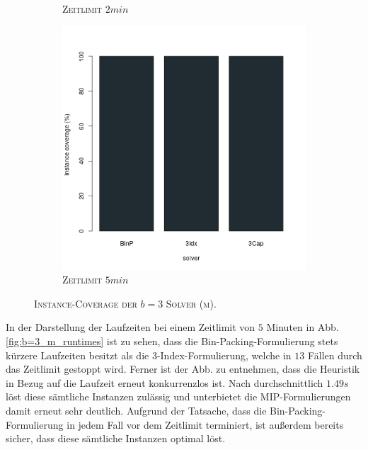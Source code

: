 \begin{figure}[H]
\begin{subfigure}[b]{0.3\textwidth}
\caption{\textsc{Zeitlimit} $2min$}
\label{fig:instance_coverage_b=3_m_b}
\end{subfigure}
\hfill
\begin{subfigure}[b]{0.3\textwidth}
\centering
\includegraphics[width=1.1\textwidth]{img/solver_instance_coverage_b=3_m_300s.png}
\caption{\textsc{Zeitlimit} $5min$}
\label{fig:instance_coverage_b=3_m_c}
\end{subfigure}
\caption{\textsc{Instance-Coverage der $b = 3$ Solver (m)}.}
\label{fig:instance_coverage_b=3_m}
\end{figure}

In der Darstellung der Laufzeiten bei einem Zeitlimit von $5$ Minuten in Abb. \ref{fig:b=3_m_runtimes} ist zu sehen, dass die Bin-Packing-Formulierung stets kürzere Laufzeiten besitzt als die 3-Index-Formulierung, welche in $13$ Fällen durch das Zeitlimit gestoppt wird. Ferner ist der Abb. zu entnehmen, dass die Heuristik in Bezug auf die Laufzeit erneut konkurrenzlos ist. Nach durchschnittlich $1.49s$ löst diese sämtliche Instanzen zulässig und unterbietet die MIP-Formulierungen damit erneut sehr deutlich. Aufgrund der Tatsache, dass die Bin-Packing-Formulierung in jedem Fall
vor dem Zeitlimit terminiert, ist außerdem bereits sicher, dass diese sämtliche Instanzen optimal löst.

